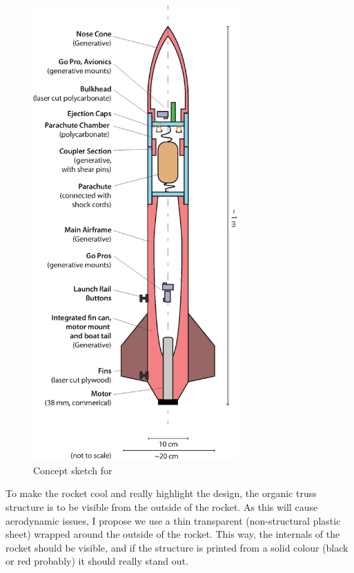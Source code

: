 \documentclass[11pt]{article}
\begin{document}
\begin{figure}[tbhp]
   \centering
   \includegraphics[width=0.7\textwidth, height=0.8\textheight,keepaspectratio]{figs/conceptSketch.eps}
   \caption{Concept sketch for }
   \label{fig:concept}
\end{figure}

To make the rocket cool and really highlight the design, the organic truss structure is to be visible from the outside of the rocket. As this will cause aerodynamic issues, I propose we use a thin transparent (non-structural plastic sheet) wrapped around the outside of the rocket. This way, the internals of the rocket should be visible, and if the structure is printed from a solid colour (black or red probably) it should really stand out. 
\end{document}
